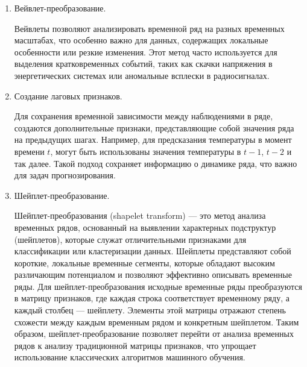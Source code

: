 \documentclass[spec, och, diploma]{SCWorks}
\begin{document}
\begin{enumerate}
                \item Вейвлет-преобразование.

                    Вейвлеты позволяют анализировать временной ряд на разных
                    временных масштабах, что особенно важно для данных,
                    содержащих локальные особенности или резкие изменения. Этот
                    метод часто используется для выделения кратковременных
                    событий, таких как скачки напряжения в энергетических
                    системах или аномальные всплески в радиосигналах.
                    \cite{wavelet}

                \item Создание лаговых признаков.
                
                    Для сохранения временной зависимости между наблюдениями в
                    ряде, создаются дополнительные признаки, представляющие
                    собой значения ряда на предыдущих шагах. Например, для
                    предсказания температуры в момент времени $t$, могут быть
                    использованы значения температуры в $t-1$, $t-2$ и так
                    далее. Такой подход сохраняет информацию о динамике ряда,
                    что важно для задач прогнозирования.

                \item Шейплет-преобразование.
                
                    Шейплет-преобразования (shapelet transform) — это метод
                    анализа временных рядов, основанный на выявлении характерных
                    подструктур (шейплетов), которые служат отличительными
                    признаками для классификации или кластеризации данных.
                    Шейплеты представляют собой короткие, локальные временные
                    сегменты, которые обладают высоким различающим потенциалом и
                    позволяют эффективно описывать временные ряды. Для
                    шейплет-преобразования исходные временные ряды преобразуются
                    в матрицу признаков, где каждая строка соответствует
                    временному ряду, а каждый столбец — шейплету. Элементы этой
                    матрицы отражают степень схожести между каждым временным
                    рядом и конкретным шейплетом. Таким образом,
                    шейплет-преобразование позволяет перейти от анализа
                    временных рядов к анализу традиционной матрицы признаков,
                    что упрощает использование классических алгоритмов машинного
                    обучения. \cite{shapelet}


\end{enumerate}
\end{document}
